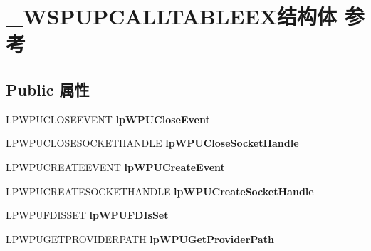 \hypertarget{struct___w_s_p_u_p_c_a_l_l_t_a_b_l_e_e_x}{}\section{\+\_\+\+W\+S\+P\+U\+P\+C\+A\+L\+L\+T\+A\+B\+L\+E\+E\+X结构体 参考}
\label{struct___w_s_p_u_p_c_a_l_l_t_a_b_l_e_e_x}
\subsection*{Public 属性}
\begin{DoxyCompactItemize}
\item 
\mbox{\label{struct___w_s_p_u_p_c_a_l_l_t_a_b_l_e_e_x_aab03ba70ce29262f4acd0fee4ff13c06}} 
L\+P\+W\+P\+U\+C\+L\+O\+S\+E\+E\+V\+E\+NT {\bfseries lp\+W\+P\+U\+Close\+Event}
\item 
\mbox{\label{struct___w_s_p_u_p_c_a_l_l_t_a_b_l_e_e_x_a681fc4a8a9e4faaa481c0a3c35af7382}} 
L\+P\+W\+P\+U\+C\+L\+O\+S\+E\+S\+O\+C\+K\+E\+T\+H\+A\+N\+D\+LE {\bfseries lp\+W\+P\+U\+Close\+Socket\+Handle}
\item 
\mbox{\label{struct___w_s_p_u_p_c_a_l_l_t_a_b_l_e_e_x_a45a71a6e72c01d18bc6b0dab0c4c54a0}} 
L\+P\+W\+P\+U\+C\+R\+E\+A\+T\+E\+E\+V\+E\+NT {\bfseries lp\+W\+P\+U\+Create\+Event}
\item 
\mbox{\label{struct___w_s_p_u_p_c_a_l_l_t_a_b_l_e_e_x_a09152644acace326b449e0e691c4b026}} 
L\+P\+W\+P\+U\+C\+R\+E\+A\+T\+E\+S\+O\+C\+K\+E\+T\+H\+A\+N\+D\+LE {\bfseries lp\+W\+P\+U\+Create\+Socket\+Handle}
\item 
\mbox{\label{struct___w_s_p_u_p_c_a_l_l_t_a_b_l_e_e_x_ad91cd1d36ab00c56c468d437abece9a3}} 
L\+P\+W\+P\+U\+F\+D\+I\+S\+S\+ET {\bfseries lp\+W\+P\+U\+F\+D\+Is\+Set}
\item 
\mbox{\label{struct___w_s_p_u_p_c_a_l_l_t_a_b_l_e_e_x_ae6dcfc11ddc3f976865a2b8fc09d6f2a}} 
L\+P\+W\+P\+U\+G\+E\+T\+P\+R\+O\+V\+I\+D\+E\+R\+P\+A\+TH {\bfseries lp\+W\+P\+U\+Get\+Provider\+Path}

\end{DoxyCompactItemize}
